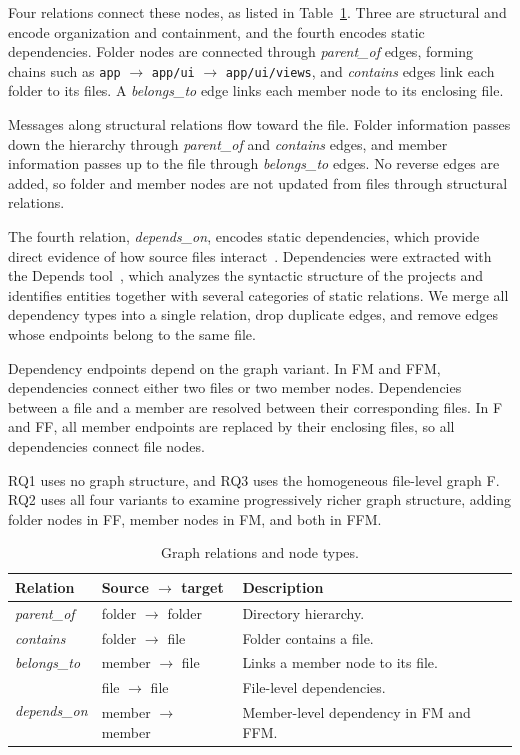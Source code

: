 Four relations connect these nodes, as listed in Table~\ref{tab:relation_types}. Three are structural and encode organization and containment, and the fourth encodes static dependencies. Folder nodes are connected through \emph{parent\_of} edges, forming chains such as \texttt{app} $\rightarrow$ \texttt{app/ui} $\rightarrow$ \texttt{app/ui/views}, and \emph{contains} edges link each folder to its files. A \emph{belongs\_to} edge links each member node to its enclosing file.

Messages along structural relations flow toward the file. Folder information passes down the hierarchy through \emph{parent\_of} and \emph{contains} edges, and member information passes up to the file through \emph{belongs\_to} edges. No reverse edges are added, so folder and member nodes are not updated from files through structural relations.

The fourth relation, \emph{depends\_on}, encodes static dependencies, which provide direct evidence of how source files interact~\cite{negar, deps_impact}. Dependencies were extracted with the Depends tool~\cite{depends}, which analyzes the syntactic structure of the projects and identifies entities together with several categories of static relations. We merge all dependency types into a single relation, drop duplicate edges, and remove edges whose endpoints belong to the same file.

Dependency endpoints depend on the graph variant. In FM and FFM, dependencies connect either two files or two member nodes. Dependencies between a file and a member are resolved between their corresponding files. In F and FF, all member endpoints are replaced by their enclosing files, so all dependencies connect file nodes.

RQ1 uses no graph structure, and RQ3 uses the homogeneous file-level graph F. RQ2 uses all four variants to examine progressively richer graph structure, adding folder nodes in FF, member nodes in FM, and both in FFM.

\begin{table}[htb]
\centering
\caption{Graph relations and node types.}
\label{tab:relation_types}
\renewcommand{\arraystretch}{1.0}
\setlength{\tabcolsep}{4pt}
\begin{tabularx}{\columnwidth}{@{}l l >{\raggedright\arraybackslash}X@{}}
\toprule
Relation & Source $\to$ target & Description \\
\midrule
\emph{parent\_of}
& folder $\to$ folder
& Directory hierarchy. \\
\emph{contains}
& folder $\to$ file
& Folder contains a file. \\
\emph{belongs\_to}
& member $\to$ file
& Links a member node to its file. \\

\multirow{2}{*}{\emph{depends\_on}}
& file $\to$ file
& File-level dependencies. \\
& member $\to$ member
& Member-level dependency in FM and FFM. \\
\bottomrule
\end{tabularx}
\end{table}
